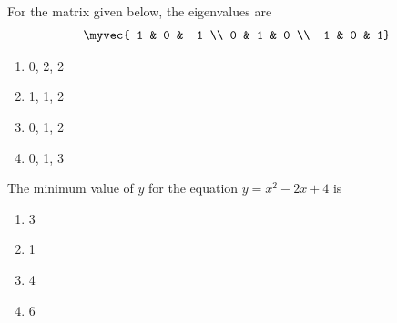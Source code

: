 \item For the matrix given below, the eigenvalues are \hfill{}
\begin{align*}
    \myvec{ 1 & 0 & -1 \\ 0 & 1 & 0 \\ -1 & 0 & 1} 
\end{align*}
\begin{multicols}{4}
\begin{enumerate}
\item 0, 2, 2
\item 1, 1, 2
\item 0, 1, 2
\item 0, 1, 3
\end{enumerate}
\end{multicols}
\item The minimum value of $y$ for the equation $y = x^2 - 2x + 4$ is \hfill{}
\begin{multicols}{4}
\begin{enumerate}
\item 3
\item 1
\item 4
\item 6
\end{enumerate}
\end{multicols}

